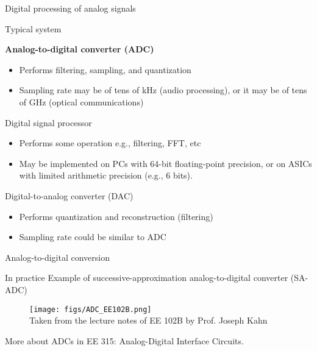 \documentclass[10pt, aspectratio=169]{beamer}
\begin{document}
\begin{frame}{Digital processing of analog signals}
	\begin{block}{Typical system}
		\vspace{-0.7cm}
		\begin{center}
			\resizebox{0.7\linewidth}{!}{}
		\end{center}
	\end{block}
	\vspace{-0.5cm}
	\begin{block}{\textbf{Analog-to-digital converter (ADC)}}
		\begin{itemize}
			\item Performs filtering, sampling, and quantization
			\item Sampling rate may be of tens of kHz (audio processing), or it may be of tens of GHz (optical communications)
		\end{itemize}
	\end{block}
	\vspace{-0.3cm}
	\begin{block}{Digital signal processor}
		\begin{itemize} \itemsep 0pt
			\item Performs some operation e.g., filtering, FFT, etc
			\item May be implemented on PCs with 64-bit floating-point precision, or on ASICs with limited arithmetic precision (e.g., 6 bits).
		\end{itemize}
	\end{block}
	\vspace{-0.3cm}
	\begin{block}{Digital-to-analog converter (DAC)}
		\begin{itemize}
			\item Performs quantization and reconstruction (filtering)
			\item Sampling rate could be similar to ADC
		\end{itemize}
	\end{block}
\end{frame}

\begin{frame}{Analog-to-digital conversion}

\begin{block}{In practice}
Example of successive-approximation analog-to-digital converter (SA-ADC)
	\begin{figure}
		\centering
		\texttt{[image: figs/ADC\_EE102B.png]}\\
		{\tiny \color{gray} Taken from the lecture notes of EE 102B by Prof. Joseph Kahn}
	\end{figure}
\end{block}

{\small More about ADCs in EE 315: Analog-Digital Interface Circuits.}

\end{frame}
\end{document}
